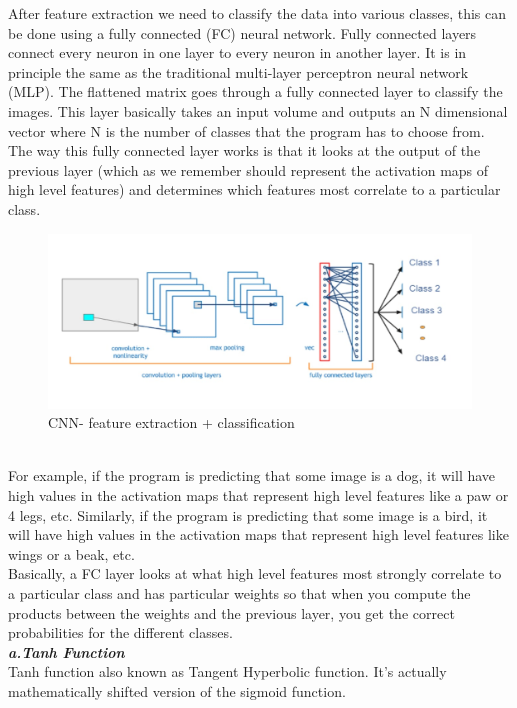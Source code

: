 After feature extraction we need to classify the data into various classes, this can be done using a fully connected (FC) neural network.
 Fully connected layers connect every neuron in one layer to every neuron in another layer. It is in principle the same as the traditional multi-layer perceptron neural network (MLP). The flattened matrix goes through a fully connected layer to classify the images.
This layer basically takes an input volume and outputs an N dimensional vector where N is the number of classes that the program has to choose from. The way this fully connected layer works is that it looks at the output of the previous layer (which as we remember should represent the activation maps of high level features) and determines which features most correlate to a particular class.\\
\begin{figure}[h]
\label{ss}
\centering
\includegraphics[width= 14cm]{FC Layer.jpeg}
\caption{CNN- feature extraction + classification}
\end{figure}
 \\For example, if the program is predicting that some image is a dog, it will have high values in the activation maps that represent high level features like a paw or 4 legs, etc. Similarly, if the program is predicting that some image is a bird, it will have high values in the activation maps that represent high level features like wings or a beak, etc.
 \\Basically, a FC layer looks at what high level features most strongly correlate to a particular class and has particular weights so that when you compute the products between the weights and the previous layer, you get the correct probabilities for the different classes.\\
 \textbf{\emph{a.Tanh Function}}
 \\Tanh function also known as Tangent Hyperbolic function. It’s actually mathematically shifted version of the sigmoid function.\\
